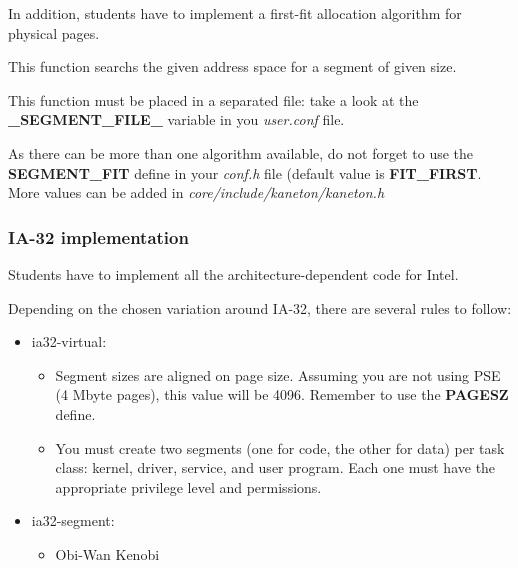 In  addition,  students  have  to  implement  a  first-fit  allocation
algorithm for physical pages.


This function searchs  the given address space for  a segment of given
size.

This function must  be placed in a separated file: take  a look at the
\textbf{\_SEGMENT\_FILE\_} variable in you \textit{user.conf} file.

As there  can be more than  one algorithm available, do  not forget to
use  the  \textbf{SEGMENT\_FIT} define  in  your \textit{conf.h}  file
(default  value is \textbf{FIT\_FIRST}.  More values  can be  added in
\textit{core/include/kaneton/kaneton.h}

\subsubsection{IA-32 implementation}

Students  have to  implement all  the architecture-dependent  code for
Intel.

Depending  on the  chosen variation  around IA-32,  there  are several
rules to follow:

\begin{itemize}

\item ia32-virtual:
\begin{itemize}

\item Segment  sizes are  aligned on page  size. Assuming you  are not
using PSE  (4 Mbyte pages), this  value will be 4096.  Remember to use
the \textbf{PAGESZ} define.

\item You must create two segments  (one for code, the other for data)
per task class:  kernel, driver, service, and user  program.  Each one
must have the appropriate privilege level and permissions.

\end{itemize}

\item ia32-segment:
\begin{itemize}

\item Obi-Wan Kenobi

\end{itemize}
\end{itemize}

